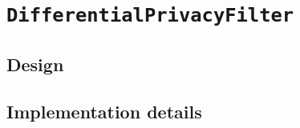 \section{\texttt{DifferentialPrivacyFilter}}
\label{Implementation:DifferentialPrivacy}

\subsection{Design}
\label{Implementation:DifferentialPrivacy:Design}

\subsection{Implementation details}
\label{Implementation:DifferentialPrivacy:Details}
